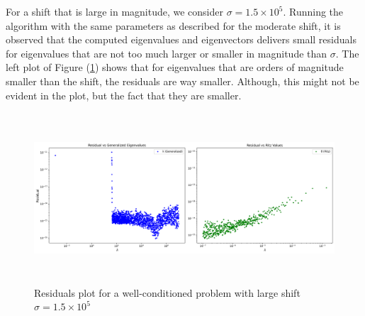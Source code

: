 For a shift that is large in magnitude, we consider $\sigma = 1.5 \times 10^5$. Running the algorithm with the same parameters as described for the moderate shift, it is observed that the computed eigenvalues and eigenvectors delivers small residuals for eigenvalues that are not too much larger or smaller in magnitude than $\sigma$. The left plot of Figure (\ref{fig:LUResidualsLargeShift}) shows that for eigenvalues that are orders of magnitude smaller than the shift, the residuals are way smaller. Although, this might not be evident in the plot, but the fact that they are smaller.


\begin{figure}
	\centering
	\caption{Residuals plot for a well-conditioned problem with large shift $\sigma=1.5 \times 10^5$}
	\includegraphics[height=2.5in]{./Plots/LU/residuals_plot_well_large.png}
	
	\label{fig:LUResidualsLargeShift}
\end{figure}




